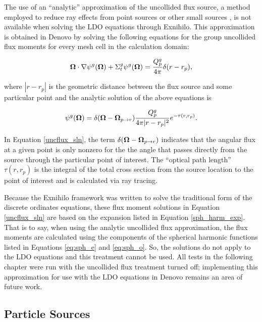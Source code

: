 The use of an ``analytic'' approximation of the uncollided flux source,
a method employed to reduce ray effects from point sources or other small sources
\cite{exum}, is not available when solving the LDO equations through Exnihilo. This
approximation is obtained in Denovo by solving the following equations for the group
uncollided flux moments for every mesh cell in the calculation domain:

\begin{equation}
\mathbf\Omega\cdot\nabla\psi^g(\mathbf\Omega) + \Sigma_t^g\psi^g(\mathbf\Omega) = \frac{Q^g_p}{4\pi}\delta(r-r_p),
\label{uncflux_eq}
\end{equation}

\noindent where $|r-r_p|$ is the geometric distance between the flux source and some
particular point and the analytic solution of the above equations is

\begin{equation}
\psi^g(\mathbf\Omega) = \delta(\mathbf\Omega - \mathbf\Omega_{p\rightarrow r})\frac{Q^g_p}{4\pi|r-r_p|^2}
e^{-\tau(r,r_p)}.
\label{uncflux_sln}
\end{equation}

\noindent In Equation \ref{uncflux_sln}, the term $\delta(\mathbf\Omega - \mathbf\Omega_{p\rightarrow r})$
indicates that the angular flux at a given point is only nonzero for the the angle that
passes directly from the source through the particular point of interest. The ``optical
path length'' $\tau(r,r_p)$ is the integral of the total cross section from the 
source location to the point of interest and is calculated via ray tracing.

Because the Exnihilo framework was written to solve the traditional form of 
the discrete ordinates equations, these flux moment solutions in Equation
\ref{uncflux_sln} are based on the expansion listed in Equation \ref{sph_harm_exp}.
That is to say, when using the analytic uncollided flux approximation, the flux moments
are calculated using the components of the spherical harmonic functions listed in
Equations \ref{eq:sph_e} and \ref{eq:sph_o}. So, the solutions do not apply to the LDO
equations and this treatment cannot be used. All tests in the following chapter were
run with the uncollided flux treatment turned off; implementing this approximation for
use with the LDO equations in Denovo remains an area of future work.

\subsection{Particle Sources}
\label{sec:ptsrc}

